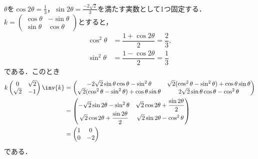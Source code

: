 \begin{npfwn}

  $ \theta $を$\cos 2\theta = \frac{1}{3} $，$\sin 2\theta = \frac{-2\sqrt{2}}{3} $を満たす実数として1つ固定する．$k =
  \begin{pmatrix}
    \cos \theta & -\sin \theta \\ \sin \theta & \cos \theta
  \end{pmatrix}
  $とすると，
  \begin{align*}
    \cos^2 \theta &= \dfrac{1 +\cos 2\theta}{2} = \dfrac{2}{3},\\
    \sin^2 \theta &= \dfrac{1-\cos 2\theta}{2} = \dfrac{1}{3}
  \end{align*}
  である．このとき
  \begin{align*}
    k
    \begin{pmatrix}
      0 & \sqrt{2} \\
      \sqrt{2} & -1 
    \end{pmatrix}\inv{k} &=
                           \begin{pmatrix}
                             -2\sqrt{2}\sin\theta \cos\theta  - \sin^2\theta & \sqrt{2}(\cos^2 \theta - \sin^2\theta) + \cos\theta \sin\theta \\
                             \sqrt{2}(\cos^2 \theta - \sin^2\theta) + \cos\theta \sin\theta  & 2\sqrt{2}\sin\theta \cos\theta  - \cos^2\theta
                           \end{pmatrix}\\
        &=
          \begin{pmatrix}
            -\sqrt{2}\sin 2\theta  - \sin^2\theta & \sqrt{2}\cos 2\theta + \dfrac{\sin 2\theta}{2} \\
            \sqrt{2}\cos 2\theta + \dfrac{\sin 2\theta}{2}  &\sqrt{2}\sin 2 \theta - \cos^2\theta
          \end{pmatrix}\\
        &=
          \begin{pmatrix}
            1  &  0\\ 0 & -2
          \end{pmatrix}
  \end{align*}
  である．


\end{npfwn}
